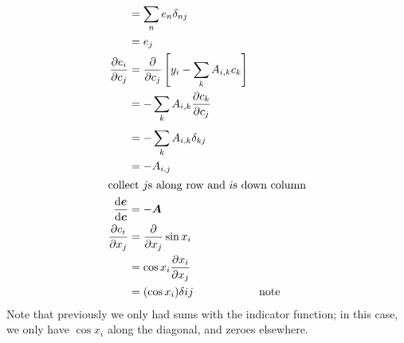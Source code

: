 \documentclass[a4paper, 12pt]{article}
\newcommand{\pdif}[2]{\frac{\partial #1}{\partial #2}}
\newcommand{\dif}[2]{\frac{\mathrm{d}#1}{\mathrm{d}#2}}
\newcommand{\summation}[2]{\sum\limits_{#1}^{#2}}
\newcommand{\mat}[1]{\boldsymbol{#1}}
\renewcommand{\vec}[1]{\boldsymbol{#1}}
\begin{document}
\begin{align*}
                & = \summation{n}{} e_n \delta_{nj} \\
                & = e_j \\
                \pdif{e_i}{c_j} & = \pdif{}{c_j} \left[y_i - \summation{k}{} A_{i, k}c_k\right] \\
                & = -\summation{k}{} A_{i,k} \pdif{c_k}{c_j} \\
                & = -\summation{k}{} A_{i,k} \delta_{kj} \\
                & = -A_{i,j} \\
                \intertext{collect $j$s along row and $i$s down column}
                \dif{\vec{e}}{\vec{c}} & = -\mat{A} \\
                \pdif{c_i}{x_j} & = \pdif{}{x_j} \sin x_i \\
                & = \cos x_i \pdif{x_i}{x_j} \\
                & = (\cos x_i) \delta{ij} & \text{note}
            \end{align*}
            Note that previously we only had sums with the indicator function; in this case, we only have $\cos x_i$ along the diagonal, and zeroes elsewhere.
            \medskip
\end{document}
